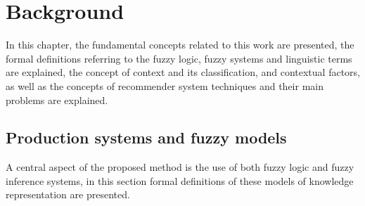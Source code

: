 \chapter{Background}\label{background}

In this chapter, the fundamental concepts related to this work are 
presented,  the formal definitions referring to the fuzzy logic, fuzzy 
systems and linguistic terms are explained, the concept of context 
and its classification, and contextual factors,  as well as the concepts
 of recommender system techniques and their main problems 
 are explained.

\section{Production systems and fuzzy models}

A central aspect of the proposed method is the use of both fuzzy 
logic and fuzzy inference systems, in this section formal definitions 
of these models of knowledge representation are presented.  

